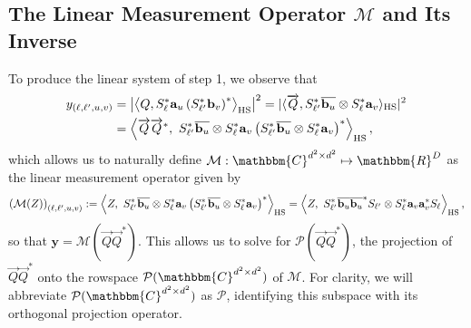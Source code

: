 \documentclass[]{spie}  %
\def \vec{\overrightarrow}
\def \a {\mathbf a}
\def \b {\mathbf b}
\def \bar {\overline}
\def \x {\mathbf x}
\def \y {\mathbf y}
\def \C {\mathbbm{C}}
\def \M {\mathcal{M}}
\def \HS {\rm HS}
\def \P {\mathcal{P}}
\DeclareMathOperator{\Tr}{\rm Trace}
\begin{document}
\subsection{The Linear Measurement Operator $\mathcal{M}$ and Its Inverse}
\label{sec:linear}
To produce the linear system of step 1, we observe that
\begin{align*}%
y_{(\ell,\ell',u,v)} &= \left| \left\langle Q, S^*_{\ell} \a_u \left(S^*_{\ell'} \b_v \right)^* \right\rangle_{\HS} \right|^2 = |\langle \vec{Q}, S_{\ell'}^* \bar{\b_u} \otimes S_{\ell}^* \a_v \rangle_{\HS} |^2 \\%
&= \left\langle  \vec{Q} \vec{Q}^*, ~S_{\ell'}^* \bar{\b_u} \otimes S_{\ell}^* \a_v \left(S_{\ell'}^* \bar{\b_u} \otimes S_{\ell}^* \a_v\right)^* \right\rangle_{\HS},
\end{align*} %
which allows us to naturally define $\mathcal{M}: \mathbbm{C}^{d^2 \times d^2} \mapsto \mathbbm{R}^D$ as the linear measurement operator given by 
\begin{equation}
\left(\mathcal{M}(Z) \right)_{(\ell,\ell',u,v)} := \left\langle  Z, ~S_{\ell'}^* \bar{\b_u} \otimes S_{\ell}^* \a_v \left(S_{\ell'}^* \bar{\b_u} \otimes S_{\ell}^* \a_v\right)^*\right\rangle_{\HS} = \left\langle Z, ~S_{\ell'}^* \bar{\b_u}\bar{\b_u}^* S_{\ell'} \otimes S_\ell^* \a_v \a_v^* S_\ell \right\rangle_{\HS},
\label{Def:Measure_Operator}
\end{equation}
so that $\y = \mathcal{M}(\vec{Q} \vec{Q}^*)$.  This allows us to solve for $\P(\vec{Q} \vec{Q}^*)$, the projection of $\vec{Q} \vec{Q}^*$ onto the rowspace $\P(\C^{d^2 \times d^2})$ of $\M$.  For clarity, we will abbreviate $\P(\C^{d^2 \times d^2})$ as $\P$, identifying this subspace with its orthogonal projection operator.
\end{document}

